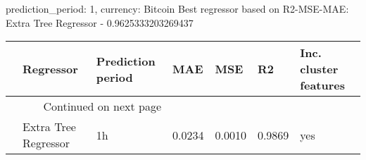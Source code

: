 
prediction_period: 1, currency: Bitcoin
Best regressor based on R2-MSE-MAE: Extra Tree Regressor - 0.9625333203269437
\begin{longtable}{lllllll}
\toprule
{} &             Regressor & Prediction period &     MAE &     MSE &      R2 & Inc. cluster features \\
\midrule
\endhead
\midrule
\multicolumn{3}{r}{{Continued on next page}} \\
\midrule
\endfoot

\bottomrule
\endlastfoot
0 &  Extra Tree Regressor &                1h &  0.0234 &  0.0010 &  0.9869 &                   yes \\
\end{longtable}
